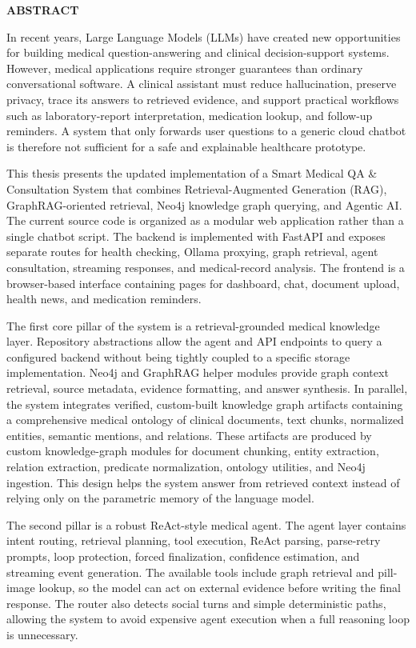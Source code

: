 \documentclass[../main.tex]{subfiles}
\begin{document}
\begin{center}
    \Large{\textbf{ABSTRACT}}\\
\end{center}
\vspace{1cm}

In recent years, Large Language Models (LLMs) have created new opportunities for building medical question-answering and clinical decision-support systems. However, medical applications require stronger guarantees than ordinary conversational software. A clinical assistant must reduce hallucination, preserve privacy, trace its answers to retrieved evidence, and support practical workflows such as laboratory-report interpretation, medication lookup, and follow-up reminders. A system that only forwards user questions to a generic cloud chatbot is therefore not sufficient for a safe and explainable healthcare prototype.

This thesis presents the updated implementation of a Smart Medical QA \& Consultation System that combines Retrieval-Augmented Generation (RAG), GraphRAG-oriented retrieval, Neo4j knowledge graph querying, and Agentic AI. The current source code is organized as a modular web application rather than a single chatbot script. The backend is implemented with FastAPI and exposes separate routes for health checking, Ollama proxying, graph retrieval, agent consultation, streaming responses, and medical-record analysis. The frontend is a browser-based interface containing pages for dashboard, chat, document upload, health news, and medication reminders.

The first core pillar of the system is a retrieval-grounded medical knowledge layer. Repository abstractions allow the agent and API endpoints to query a configured backend without being tightly coupled to a specific storage implementation. Neo4j and GraphRAG helper modules provide graph context retrieval, source metadata, evidence formatting, and answer synthesis. In parallel, the system integrates verified, custom-built knowledge graph artifacts containing a comprehensive medical ontology of clinical documents, text chunks, normalized entities, semantic mentions, and relations. These artifacts are produced by custom knowledge-graph modules for document chunking, entity extraction, relation extraction, predicate normalization, ontology utilities, and Neo4j ingestion. This design helps the system answer from retrieved context instead of relying only on the parametric memory of the language model.

The second pillar is a robust ReAct-style medical agent. The agent layer contains intent routing, retrieval planning, tool execution, ReAct parsing, parse-retry prompts, loop protection, forced finalization, confidence estimation, and streaming event generation. The available tools include graph retrieval and pill-image lookup, so the model can act on external evidence before writing the final response. The router also detects social turns and simple deterministic paths, allowing the system to avoid expensive agent execution when a full reasoning loop is unnecessary.
\end{document}
